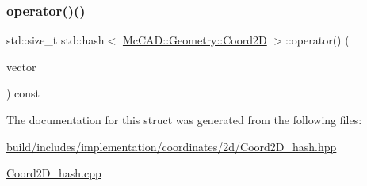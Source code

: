 \subsubsection{\texorpdfstring{operator()()}{operator()()}\hspace{0.1cm}{\footnotesize\ttfamily [2/2]}}
{\footnotesize\ttfamily std\+::size\+\_\+t std\+::hash$<$ \hyperlink{classMcCAD_1_1Geometry_1_1Coord2D}{Mc\+C\+A\+D\+::\+Geometry\+::\+Coord2D} $>$\+::operator() (\begin{DoxyParamCaption}\item[{const \hyperlink{classMcCAD_1_1Geometry_1_1Coord2D}{Mc\+C\+A\+D\+::\+Geometry\+::\+Coord2D} \&}]{vector }\end{DoxyParamCaption}) const}



The documentation for this struct was generated from the following files\+:\begin{DoxyCompactItemize}
\item 
\hyperlink{build_2includes_2implementation_2coordinates_22d_2Coord2D__hash_8hpp}{build/includes/implementation/coordinates/2d/\+Coord2\+D\+\_\+hash.\+hpp}\item 
\hyperlink{Coord2D__hash_8cpp}{Coord2\+D\+\_\+hash.\+cpp}\end{DoxyCompactItemize}
